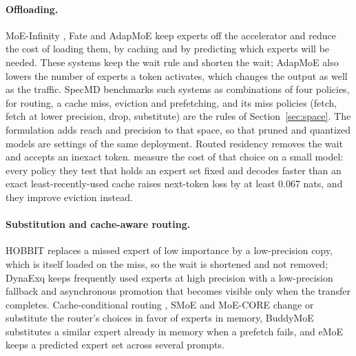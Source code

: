 \documentclass[11pt]{article}
\begin{document}
\paragraph{Offloading.} MoE-Infinity \citep{xue2024moeinfinity}, Fate \citep{fang2025fate} and
AdapMoE \citep{zhong2024adapmoe} keep experts off the accelerator and reduce the cost of
loading them, by caching and by predicting which experts will be needed. These systems keep
the wait rule and shorten the wait; AdapMoE also lowers the number of experts a token activates, which changes the output as well as the traffic. SpecMD \citep{hoang2026specmd} benchmarks such systems as
combinations of four policies, for routing, a cache miss, eviction and prefetching, and its miss
policies (fetch, fetch at lower precision, drop, substitute) are the rules of
Section~\ref{sec:space}. The formulation adds reach and precision to that space, so that pruned
and quantized models are settings of the same deployment. Routed residency removes the wait and
accepts an inexact token. \citet{bacon2026fewer} measure the cost of that choice on a small model:
every policy they test that holds an expert set fixed and decodes faster than an exact
least-recently-used cache raises next-token loss by at least 0.067 nats, and they improve
eviction instead.

\paragraph{Substitution and cache-aware routing.} HOBBIT \citep{tang2024hobbit} replaces a
missed expert of low importance by a low-precision copy, which is itself loaded on the miss, so the wait is shortened and not removed; DynaExq \citep{chu2025dynaexq} keeps frequently used experts at
high precision with a low-precision fallback and asynchronous promotion that becomes visible
only when the transfer completes. Cache-conditional
routing \citep{skliar2024cache}, SMoE \citep{zhu2025smoe} and MoE-CORE \citep{yang2026moecore}
change or substitute the router's choices in favor of experts in memory, BuddyMoE
\citep{wang2025buddymoe} substitutes a similar expert already in memory when a prefetch fails, and
eMoE \citep{tairin2025emoe} keeps a predicted expert set across several prompts.
\end{document}
